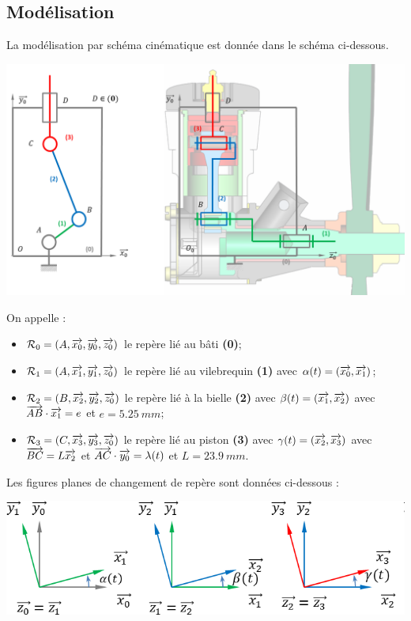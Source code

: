 \documentclass[10pt,fleqn]{article} %
\begin{document}
\begin{multicols}{2}
\section*{Modélisation}
La modélisation par schéma cinématique est donnée dans le schéma ci-dessous. 
\begin{center}
\includegraphics[width=\linewidth]{images/fig_06}
\end{center}
On appelle : 
\begin{itemize}
\item $\mathcal{R}_0=\left(A,\overrightarrow{x_0},\overrightarrow{y_0},\overrightarrow{z_0} \right)$ le repère lié au bâti \textbf{(0)};
\item $\mathcal{R}_1=\left(A,\overrightarrow{x_1},\overrightarrow{y_1},\overrightarrow{z_0} \right)$ le repère lié au vilebrequin \textbf{(1)} avec $\alpha(t)=\left(\overrightarrow{x_0},\overrightarrow{x_1}\right)$;
\item $\mathcal{R}_2=\left(B,\overrightarrow{x_2},\overrightarrow{y_2},\overrightarrow{z_0} \right)$ le repère lié à la bielle \textbf{(2)} avec $\beta(t)=\left(\overrightarrow{x_1},\overrightarrow{x_2}\right)$ avec $\overrightarrow{AB}\cdot \overrightarrow{x_1}=e$ et $e=\SI{5,25}{mm}$;
\item $\mathcal{R}_3=\left(C,\overrightarrow{x_3},\overrightarrow{y_3},\overrightarrow{z_0} \right)$ le repère lié au piston \textbf{(3)} avec $\gamma(t)=\left(\overrightarrow{x_2},\overrightarrow{x_3}\right)$ avec $\overrightarrow{BC}=L\overrightarrow{x_2}$ et $\overrightarrow{AC}\cdot \overrightarrow{y_0}=\lambda(t)$ et $L=\SI{23,9}{mm}$.
\end{itemize}
Les figures planes de changement de repère sont données ci-dessous : 
\begin{center}
\includegraphics[width=\linewidth]{images/fig_05}
\end{center}


\end{multicols}
\end{document}
